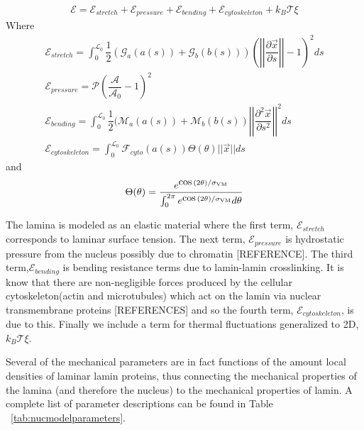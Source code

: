 \begin{align}
\mathcal{E} = \mathcal{E}_{stretch} + \mathcal{E}_{pressure} +\mathcal{E}_{bending} + \mathcal{E}_{cytoskeleton} + k_B\mathcal{T} \xi
\end{align}
Where 
\begin{align}
\mathcal{E}_{stretch} = \displaystyle \int_0^{\mathcal{L}_0} \dfrac{1}{2} (\mathcal{G}_a(a(s)) +\mathcal{G}_b(b(s)) )\left( \left |\left| \dfrac{\partial \vec{x} }{\partial s} \right|\right| - 1\right)^2 ds \\
\mathcal{E}_{pressure}  = \mathcal{P} \left( \dfrac{\mathcal{A}}{\mathcal{A}_0} -1\right)^2  \\
\mathcal{E}_{bending} = \displaystyle\int_0^{\mathcal{L}_0} \dfrac{1}{2 } (\mathcal{M}_a(a(s)) + \mathcal{M}_b (b(s)) \left|\left| \dfrac{\partial^2 \vec{x}}{\partial s^2} \right|\right|^2 ds\\
\mathcal{E}_{cytoskeleton} = \displaystyle\int_0^{\mathcal{L}_0} \mathcal{F}_{cyto} (a(s))\Theta (\theta) || \vec{x} || ds 
\end{align}
and \[ \Theta (\theta) = \dfrac{e^{\cos(2\theta)/\sigma_{\rm VM }}}{\int_0^{ 2\pi} e^{\cos(2\theta)/\sigma_{\rm VM}}d \theta} \]

The lamina is modeled as an elastic material where the first term, $\mathcal{E}_{stretch}$ corresponds to laminar surface tension. The next term, $\mathcal{E}_{pressure}$ is hydrostatic pressure from the nucleus possibly due to chromatin [REFERENCE]. The third term,$\mathcal{E}_{bending}$  is bending resistance terms due to lamin-lamin crosslinking. It is know that there are non-negligible forces produced by the cellular cytoskeleton(actin and microtubules) which act on the lamin via nuclear transmembrane proteins [REFERENCES] and so the fourth term, $\mathcal{E}_{cytoskeleton}$, is due to this. Finally we include a term for thermal fluctuations generalized to 2D, $k_B\mathcal{T} \xi$. 


Several of the mechanical parameters are in fact functions of the amount local densities of laminar lamin proteins, thus connecting the mechanical properties of the lamina (and therefore the nucleus) to the mechanical properties of lamin. A complete list of parameter descriptions can be found in Table ~\ref{tab:nucmodelparameters}.

